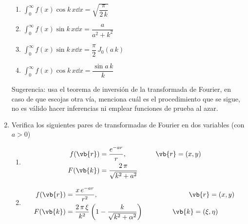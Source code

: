 \begin{enumerate}
\begin{enumerate}[label=\roman*)]
\setlength\itemsep{1em}
\item $\displaystyle \int_{0}^{\infty} f(x) \cos k \, x \dd x = \sqrt{\dfrac{\pi}{2 \, k}}$
\item $\displaystyle \int_{0}^{\infty} f(x) \sin k \, x \dd x = \dfrac{a}{a^{2} +k^{2}}$
\item $\displaystyle \int_{0}^{\infty} f(x) \sin k \, x \dd x = \dfrac{\pi}{2} \,  J_{0} (a \, k)$
\item $\displaystyle \int_{0}^{\infty} f(x) \cos k \, x \dd x = \dfrac{\sin a \,k}{k}$
\end{enumerate}
Sugerencia: usa el teorema de inversión de la transformada de Fourier, en caso de que escojas otra vía, menciona cuál es el procedimiento que se sigue, no es válido hacer inferencias ni emplear funciones de prueba al azar.
\item Verifica los siguientes pares de transformadas de Fourier en dos variables (con $a > 0$)
\begin{enumerate}[label=\roman*)]
\item \begin{align*}
f(\vb{r})& = \dfrac{e^{-ar}}{r}, \hspace{1.5cm} \vb{r} = (x, y) \\
F(\vb{k}) &= \dfrac{2 \, \pi}{\sqrt{k^{2} + a^{2}}}
\end{align*}
\item \begin{align*}
f(\vb{r}) &= \dfrac{x \, e^{-ar}}{r^{2}}, \hspace{4.7cm} \vb{r} = (x, y) \\
F(\vb{k}) &= \dfrac{2 \, \pi \, \xi}{k^{2}} \left( 1 - \dfrac{k}{\sqrt{k^{2} + \alpha^{2}}} \right) \hspace{1.5cm} \vb{k} = (\xi, \eta)
\end{align*}
\end{enumerate}
\end{enumerate}
